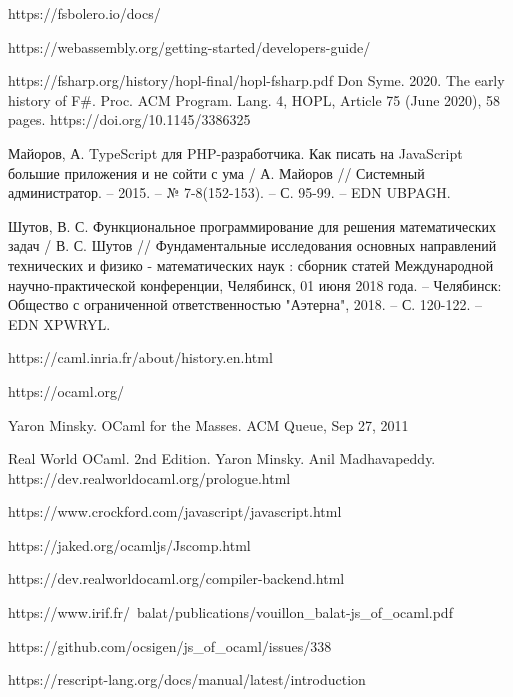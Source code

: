 \begin{thebibliography}{00}
    https://fsbolero.io/docs/ \TODO

    https://webassembly.org/getting-started/developers-guide/ \TODO

    https://fsharp.org/history/hopl-final/hopl-fsharp.pdf
    Don Syme. 2020. The early history of F\#. Proc. ACM Program. Lang. 4, HOPL, Article 75 (June 2020), 58 pages. https://doi.org/10.1145/3386325
    \TODO

    Майоров, А. TypeScript для PHP-разработчика. Как писать на JavaScript большие приложения и не сойти с ума /
    А. Майоров // Системный администратор. – 2015. – № 7-8(152-153). – С. 95-99. – EDN UBPAGH.

    Шутов, В. С. Функциональное программирование для решения математических задач
    / В. С. Шутов // Фундаментальные исследования основных направлений технических и физико - математических наук
    : сборник статей Международной научно-практической конференции, Челябинск, 01 июня 2018 года.
    – Челябинск: Общество с ограниченной ответственностью "Аэтерна", 2018. – С. 120-122. – EDN XPWRYL.

    https://caml.inria.fr/about/history.en.html \TODO

    https://ocaml.org/ \TODO

    Yaron Minsky. OCaml for the Masses. ACM Queue, Sep 27, 2011 \TODO

    Real World OCaml. 2nd Edition. Yaron Minsky. Anil Madhavapeddy.
    https://dev.realworldocaml.org/prologue.html \TODO

    https://www.crockford.com/javascript/javascript.html

    https://jaked.org/ocamljs/Jscomp.html \TODO

    https://dev.realworldocaml.org/compiler-backend.html \TODO

    https://www.irif.fr/~balat/publications/vouillon\_balat-js\_of\_ocaml.pdf \TODO

    https://github.com/ocsigen/js\_of\_ocaml/issues/338 \TODO

    https://rescript-lang.org/docs/manual/latest/introduction \TODO


\end{thebibliography}
